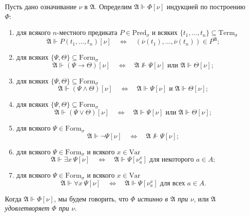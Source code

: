 \documentclass[12pt,a4paper]{article}
\newcommand{\Formul}{\ensuremath{\mathrm{Form}}\xspace}
\newcommand{\Pred}{\ensuremath{\mathrm{Pred}}\xspace}
\newcommand{\Var}{\ensuremath{\mathrm{Var}}\xspace}
\newcommand{\Term}{\ensuremath{\mathrm{Term}}\xspace}
\begin{document}
    \begin{definition}
        Пусть дано означивание $\nu$ в $\mathfrak{A}$. Определим $\mathfrak{A} \Vdash \Phi[\nu]$ индукцией по построению $\Phi$:
        \begin{enumerate}
            \item для всякого $n$-местного предиката $P \in \Pred_\sigma$ и всяких $\{t_1, \dots, t_n\} \subseteq \Term_\sigma$
                \[
                    \mathfrak{A} \Vdash P(t_1, \dots, t_n)[\nu]
                    \quad \Longleftrightarrow \quad
                    (\overline{\nu}(t_1), \dots, \overline{\nu}(t_n)) \in P^\mathfrak{A};
                \]
            \item для всяких $\{\Psi, \Theta\} \subseteq \Formul_\sigma$
                \[
                    \mathfrak{A} \Vdash (\Psi \rightarrow \Theta)[\nu]
                    \quad \Longleftrightarrow \quad
                    \mathfrak{A} \nVdash \Psi[\nu] \text{ или } \mathfrak{A} \Vdash \Theta[\nu];
                \]
            \item для всяких $\{\Psi, \Theta\} \subseteq \Formul_\sigma$
                \[
                    \mathfrak{A} \Vdash (\Psi \wedge \Theta)[\nu]
                    \quad \Longleftrightarrow \quad
                    \mathfrak{A} \Vdash \Psi[\nu] \text{ и } \mathfrak{A} \Vdash \Theta[\nu];
                \]
            \item для всяких $\{\Psi, \Theta\} \subseteq \Formul_\sigma$
                \[
                    \mathfrak{A} \Vdash (\Psi \vee \Theta)[\nu]
                    \quad \Longleftrightarrow \quad
                    \mathfrak{A} \Vdash \Psi[\nu] \text{ или } \mathfrak{A} \Vdash \Theta[\nu];
                \]
            \item для всякого $\Psi \in \Formul_\sigma$
                \[
                    \mathfrak{A} \Vdash \neg \Psi[\nu]
                    \quad \Longleftrightarrow \quad
                    \mathfrak{A} \nVdash \Psi[\nu];
                \]
            \item для всякого $\Psi \in \Formul_\sigma$ и всякого $x \in \Var$
                \[
                    \mathfrak{A} \Vdash \exists x\ \Psi[\nu]
                    \quad \Longleftrightarrow \quad
                    \mathfrak{A} \Vdash \Psi[\nu_a^x] \text{ для некоторого } a \in A;
                \]
            \item для всякого $\Psi \in \Formul_\sigma$ и всякого $x \in \Var$
                \[
                    \mathfrak{A} \Vdash \forall x\ \Psi[\nu]
                    \quad \Longleftrightarrow \quad
                    \mathfrak{A} \Vdash \Psi[\nu_a^x] \text{ для всех } a \in A.
                \]
        \end{enumerate}

        Когда $\mathfrak{A} \Vdash \Phi[\nu]$, мы будем говорить, что \emph{$\Phi$ истинно в $\mathfrak{A}$ при $\nu$}, или \emph{$\mathfrak{A}$ удовлетворяет $\Phi$ при $\nu$}.
    \end{definition}
\end{document}
